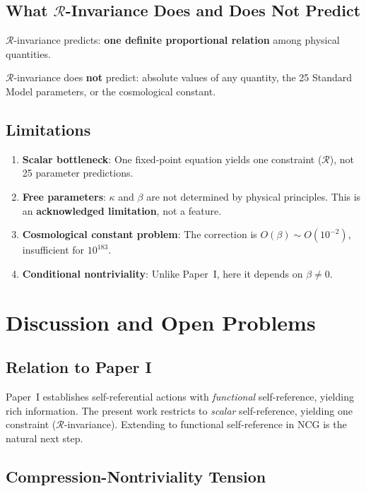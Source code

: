 \documentclass[11pt,a4paper]{article}
\theoremstyle{remark}
\newcommand{\R}{\mathcal{R}}
\begin{document}
\subsection{What $\R$-Invariance Does and Does Not Predict}

$\R$-invariance predicts: \textbf{one definite proportional relation} among physical quantities.

$\R$-invariance does \textbf{not} predict: absolute values of any quantity, the 25 Standard Model parameters, or the cosmological constant.

\subsection{Limitations}

\begin{enumerate}
  \item \textbf{Scalar bottleneck}: One fixed-point equation yields one constraint ($\R$), not 25 parameter predictions.
  \item \textbf{Free parameters}: $\kappa$ and $\beta$ are not determined by physical principles. This is an \textbf{acknowledged limitation}, not a feature.
  \item \textbf{Cosmological constant problem}: The correction is $O(\beta) \sim O(10^{-2})$, insufficient for $10^{183}$.
  \item \textbf{Conditional nontriviality}: Unlike Paper~I, here it depends on $\beta \neq 0$.
\end{enumerate}

\section{Discussion and Open Problems}

\subsection{Relation to Paper I}

Paper~I establishes self-referential actions with \emph{functional} self-reference, yielding rich information. The present work restricts to \emph{scalar} self-reference, yielding one constraint ($\R$-invariance). Extending to functional self-reference in NCG is the natural next step.

\subsection{Compression-Nontriviality Tension}
\end{document}
